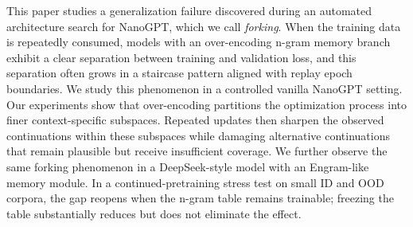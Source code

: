 This paper studies a generalization failure discovered during an automated architecture search for NanoGPT, which we call \emph{forking}. When the training data is repeatedly consumed, models with an over-encoding n-gram memory branch exhibit a clear separation between training and validation loss, and this separation often grows in a staircase pattern aligned with replay epoch boundaries. We study this phenomenon in a controlled vanilla NanoGPT setting. Our experiments show that over-encoding partitions the optimization process into finer context-specific subspaces. Repeated updates then sharpen the observed continuations within these subspaces while damaging alternative continuations that remain plausible but receive insufficient coverage. We further observe the same forking phenomenon in a DeepSeek-style model with an Engram-like memory module. In a continued-pretraining stress test on small ID and OOD corpora, the gap reopens when the n-gram table remains trainable; freezing the table substantially reduces but does not eliminate the effect.
